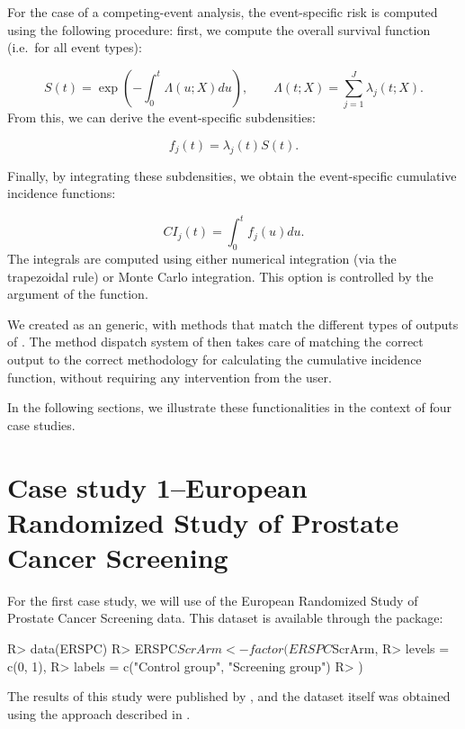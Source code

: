 \documentclass[
]{jss}
\begin{document}
For the case of a competing-event analysis, the event-specific risk is
computed using the following procedure: first, we compute the overall
survival function (i.e.~for all event types):

\[ S(t) = \exp\left(-\int_0^t \Lambda(u;X) du\right),\qquad \Lambda(t;X) = \sum_{j=1}^J \lambda_j(t;X).\]
From this, we can derive the event-specific subdensities:

\[ f_j(t) = \lambda_j(t)S(t).\]

Finally, by integrating these subdensities, we obtain the event-specific
cumulative incidence functions:

\[ CI_j(t) = \int_0^t f_j(u)du.\] The integrals are computed using
either numerical integration (via the trapezoidal rule) or Monte Carlo
integration. This option is controlled by the argument  of
the  function.

We created  as an  generic, with methods
that match the different types of outputs of . The
method dispatch system of  then takes care of matching the
correct output to the correct methodology for calculating the cumulative
incidence function, without requiring any intervention from the user.

In the following sections, we illustrate these functionalities in the
context of four case studies.

\hypertarget{case-study-1european-randomized-study-of-prostate-cancer-screening}{%
\section{Case study 1--European Randomized Study of Prostate Cancer
Screening}\label{case-study-1european-randomized-study-of-prostate-cancer-screening}}

For the first case study, we will use of the European Randomized Study
of Prostate Cancer Screening data. This dataset is available through the
 package:

\begin{CodeChunk}

\begin{CodeInput}
R> data(ERSPC)
R> ERSPC$ScrArm <- factor(ERSPC$ScrArm,
R>   levels = c(0, 1),
R>   labels = c("Control group", "Screening group")
R> )
\end{CodeInput}
\end{CodeChunk}

The results of this study were published by
\citep{schroder2009screening}, and the dataset itself was obtained using
the approach described in \citep{liu2014recovering}.
\end{document}
